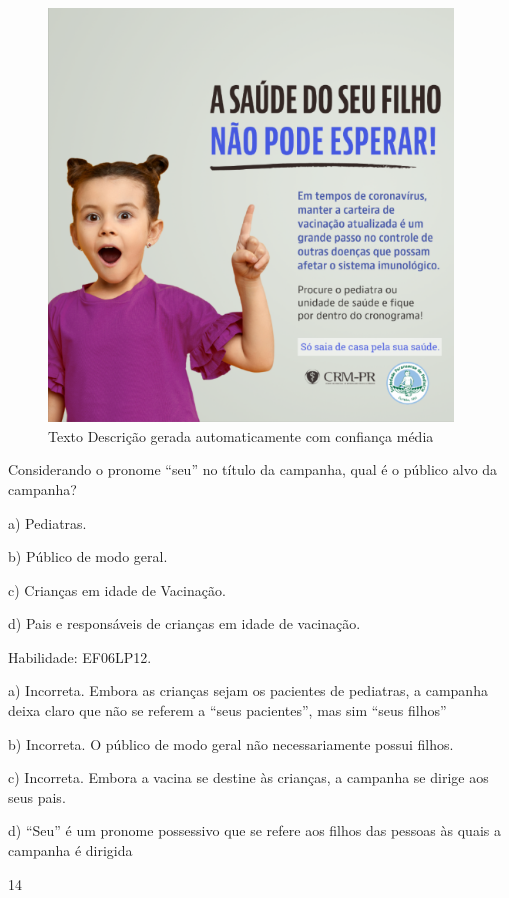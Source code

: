 \begin{figure}
\centering
\includegraphics[width=4.23378in,height=4.3141in]{./imgSAEB_6_POR/media/image36.png}
\caption{Texto Descrição gerada automaticamente com confiança média}
\end{figure}


Considerando o pronome ``seu'' no título da campanha, qual é o público
alvo da campanha?

a) Pediatras.

b) Público de modo geral.

c) Crianças em idade de Vacinação.

d) Pais e responsáveis de crianças em idade de vacinação.

Habilidade: EF06LP12.

a) Incorreta. Embora as crianças sejam os pacientes de pediatras, a
campanha deixa claro que não se referem a ``seus pacientes'', mas sim
``seus filhos''

b) Incorreta. O público de modo geral não necessariamente possui filhos.

c) Incorreta. Embora a vacina se destine às crianças, a campanha se
dirige aos seus pais.

d) ``Seu'' é um pronome possessivo que se refere aos filhos das pessoas
às quais a campanha é dirigida

\num{14}

